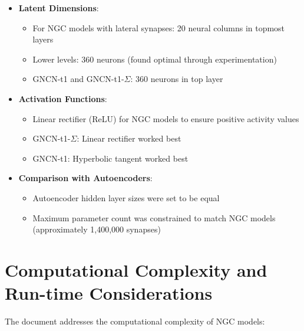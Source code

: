 \documentclass{article}
\begin{document}
\begin{itemize}
  \item \textbf{Latent Dimensions}: 
  \begin{itemize}
    \item For NGC models with lateral synapses: 20 neural columns in topmost layers
    \item Lower levels: 360 neurons (found optimal through experimentation)
    \item GNCN-t1 and GNCN-t1-$\Sigma$: 360 neurons in top layer
  \end{itemize}

  \item \textbf{Activation Functions}:
  \begin{itemize}
    \item Linear rectifier (ReLU) for NGC models to ensure positive activity values
    \item GNCN-t1-$\Sigma$: Linear rectifier worked best
    \item GNCN-t1: Hyperbolic tangent worked best
  \end{itemize}

  \item \textbf{Comparison with Autoencoders}:
  \begin{itemize}
    \item Autoencoder hidden layer sizes were set to be equal
    \item Maximum parameter count was constrained to match NGC models (approximately 1,400,000 synapses)
  \end{itemize}
\end{itemize}

\section{Computational Complexity and Run-time Considerations}

The document addresses the computational complexity of NGC models:
\end{document}
